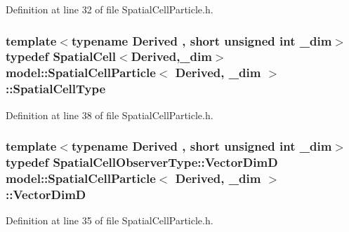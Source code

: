 Definition at line 32 of file Spatial\+Cell\+Particle.\+h.

\hypertarget{structmodel_1_1_spatial_cell_particle_adddb2dcfb73964f57e72392f16346484}{}
\subsubsection[{Spatial\+Cell\+Type}]{\setlength{\rightskip}{0pt plus 5cm}template$<$typename Derived , short unsigned int \+\_\+dim$>$ typedef {\bf Spatial\+Cell}$<$Derived,\+\_\+dim$>$ {\bf model\+::\+Spatial\+Cell\+Particle}$<$ Derived, \+\_\+dim $>$\+::{\bf Spatial\+Cell\+Type}}\label{structmodel_1_1_spatial_cell_particle_adddb2dcfb73964f57e72392f16346484}


Definition at line 38 of file Spatial\+Cell\+Particle.\+h.

\hypertarget{structmodel_1_1_spatial_cell_particle_a924d94d0c762c92744fae31f43b920e4}{}
\subsubsection[{Vector\+Dim\+D}]{\setlength{\rightskip}{0pt plus 5cm}template$<$typename Derived , short unsigned int \+\_\+dim$>$ typedef {\bf Spatial\+Cell\+Observer\+Type\+::\+Vector\+Dim\+D} {\bf model\+::\+Spatial\+Cell\+Particle}$<$ Derived, \+\_\+dim $>$\+::{\bf Vector\+Dim\+D}}\label{structmodel_1_1_spatial_cell_particle_a924d94d0c762c92744fae31f43b920e4}


Definition at line 35 of file Spatial\+Cell\+Particle.\+h.



